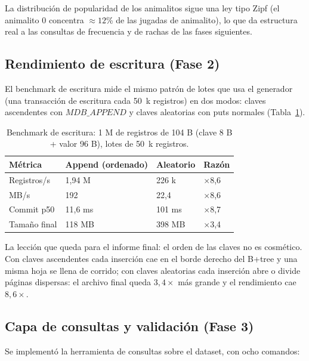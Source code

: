 \documentclass[12pt, letterpaper]{article}
\begin{document}
La distribución de popularidad de los animalitos sigue una ley tipo Zipf
(el animalito 0 concentra $\approx 12$\% de las jugadas de animalito), lo que
da estructura real a las consultas de frecuencia y de rachas de las fases
siguientes.

\subsection{Rendimiento de escritura (Fase 2)}

El benchmark de escritura mide el mismo patrón de lotes que usa el generador
(una transacción de escritura cada 50~k registros) en dos modos: claves
ascendentes con $MDB\_APPEND$ y claves aleatorias con puts normales
(Tabla~\ref{tab:escritura}).

\begin{table}[H]
\centering
\caption{Benchmark de escritura: 1 M de registros de 104 B (clave 8 B +
valor 96 B), lotes de 50~k registros.}
\label{tab:escritura}
\begin{tabular}{@{}l l l l@{}}
\toprule
\textbf{Métrica} & \textbf{Append (ordenado)} & \textbf{Aleatorio} & \textbf{Razón} \\
\midrule
Registros/s & 1,94 M & 226 k & $\times$8,6 \\
MB/s & 192 & 22,4 & $\times$8,6 \\
Commit p50 & 11,6 ms & 101 ms & $\times$8,7 \\
Tamaño final & 118 MB & 398 MB & $\times$3,4 \\
\bottomrule
\end{tabular}
\end{table}

La lección que queda para el informe final: el orden de las claves no es
cosmético. Con claves ascendentes cada inserción cae en el borde derecho del
B+tree y una misma hoja se llena de corrido; con claves aleatorias cada
inserción abre o divide páginas dispersas: el archivo final queda
$3{,}4\times$ más grande y el rendimiento cae $8{,}6\times$.

\subsection{Capa de consultas y validación (Fase 3)}

Se implementó la herramienta de consultas sobre el dataset, con ocho
comandos:
\end{document}
